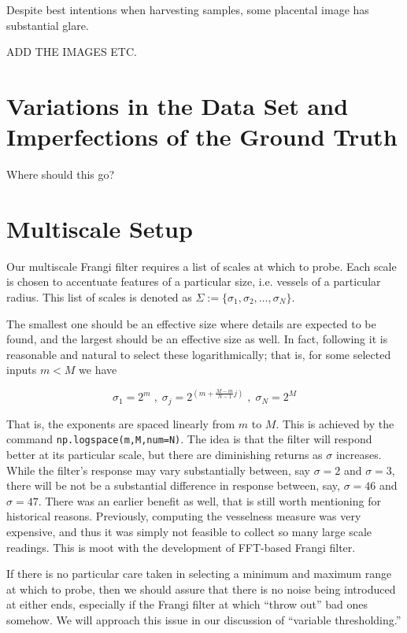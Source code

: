 	Despite best intentions when harvesting samples, some placental image has substantial glare.
	
	ADD THE IMAGES ETC.

\section{Variations in the Data Set and Imperfections of the Ground Truth}
	
	Where should this go?
	
\section{Multiscale Setup}

	Our multiscale Frangi filter requires a list of scales at which to probe. Each scale is chosen to accentuate features of a particular size, i.e. vessels of a particular radius. This  list of scales is denoted as $\Sigma := \{ \sigma_1, \sigma_2, \dots, \sigma_N\}$. 
	 
	The smallest one should be an effective size where details are expected to be found, and the largest should be an effective size as well. In fact, following \cite{Koenderink} it is reasonable and natural to select these logarithmically; that is,
	for some selected inputs $m < M$ we have
	
	\begin{equation}
	\sigma_1 = 2^{m} \; , \; \sigma_{j} = 2^{\left(m+\frac{M-m}{N-1}j\right)} \; , \; \sigma_N = 2^{M} \end{equation}
	
	That is, the exponents are spaced linearly from $m$ to $M$. This is achieved by the command
	\texttt{np.logspace(m,M,num=N)}. The idea is that the filter will respond better at its particular scale, but there are diminishing returns as $\sigma$ increases. While the filter's response may vary substantially between, say $\sigma=2$ and $\sigma=3$, there will be not be a substantial difference in response between, say, $\sigma=46$ and $\sigma=47$. There was an earlier benefit as well, that is still worth mentioning for historical reasons. Previously, computing the vesselness measure was very expensive, and thus it was simply not feasible to collect so many large scale readings. This is moot with the development of FFT-based Frangi filter.
	
	If there is no particular care taken in selecting a minimum and maximum range at which to probe, then we should assure that there is no noise being introduced at either ends, especially if the Frangi filter at which   ``throw out'' bad ones somehow. We will approach this issue in our discussion of ``variable thresholding.''
	
